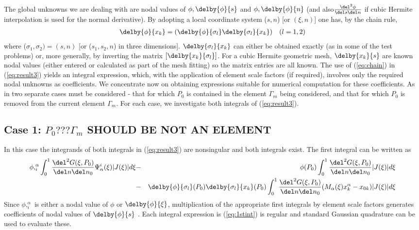 The global unknowns we are dealing with are nodal values of
$\phi,\delby{\phi}{s}$ and $\phi,\delby{\phi}{n}$ (and
also$\frac{\del^{2}\phi}{\del s\del n}$ if cubic Hermite interpolation is used
for the normal derivative).  By adopting a local coordinate system ($s,n$) [or
$(\xi,n)$] one has, by the chain rule,
\begin{eqnarray}
 \delby{\phi}{x_{k}}=\left(\delby{\phi}{\sigma_{l}}\delby{\sigma_{l}}
  {x_{k}}\right) & & (l=1,2)
 \label{eq:chain}
\end{eqnarray}
where ($\sigma_{1},\sigma_{2}) = (s,n)$ [or ($s_{1}, s_{2}, n$) in three
dimensions]. $\delby{\sigma_{l}}{x_{k}}$ can either be obtained exactly (as in
some of the test problems) or, more generally, by inverting the matrix
$\left[\delby{x_{k}}{\sigma_{l}}\right]$.  For a cubic Hermite geometric mesh,
$\delby{x_{k}}{s}$ are known nodal values (either entered or calculated as
part of the mesh fitting) so the matrix entries are all known.  The use of
(\ref{eq:chain}) in (\ref{eq:result3}) yields an integral expression, which,
with the application of element scale factors (if required), involves only the
required nodal unknowns as coefficients.  We concentrate now on obtaining
expressions suitable for numerical computation for these coefficients.  As in
\cite{liu:1992} two separate cases must be considered - that for which $P_{0}$
is contained in the element $\Gamma_{m}$ being considered, and that for which
$P_{0}$ is removed from the current element $\Gamma_{m}$.  For each case, we
investigate both integrals of (\ref{eq:result3}).

\subsection*{Case 1:  $P_{0}??? \Gamma_{m}$ SHOULD BE NOT AN ELEMENT} 
In this case the integrands of both integrals in (\ref{eq:result3}) are
nonsingular and both integrals exist.  The first integral can be written as
\begin{eqnarray}
 \phi,_{i}^{\alpha}\int_{0}^{1}\frac{\del^{2}G(\xi,P_{0})}
  {\del n\del n_{0}}\Psi_{\alpha}^{i}(\xi)|J(\xi)|d\xi &-& \phi(P_{0})
  \int_{0}^{1}\frac{\del^{2}G(\xi,P_{0})}
  {\del n\del n_{0}}|J(\xi)|d\xi\nonumber\\
 &-&\delby{\phi}{\sigma_{l}}(P_{0})\delby{\sigma_{l}}{x_{k}}(P_{0})
   \int_{0}^{1}\frac{\del^{2}G(\xi,P_{0})}{\del n\del n_{0}}
   (M_{\alpha}(\xi)x_{k}^{\alpha}-x_{0k})|J(\xi)|d\xi
 \label{eq:1stint}
\end{eqnarray}
Since $\phi,_{i}^{\alpha}$ is either a nodal value of $\phi$ or
$\delby{\phi}{\xi}$, multiplication of the appropriate first integrals by
element scale factors generates coefficients of nodal values of
$\delby{\phi}{s}$ .  Each integral expression is (\ref{eq:1stint}) is regular
and standard Gaussian quadrature can be used to evaluate these.

